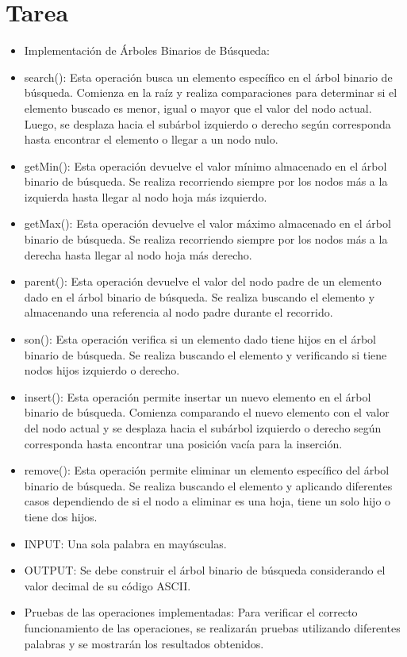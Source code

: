 \documentclass{article}
\begin{document}
	\section{Tarea}
	\begin{itemize}
		\item Implementación de Árboles Binarios de Búsqueda:
		\item search(): Esta operación busca un elemento específico en el árbol binario de búsqueda. Comienza en la raíz y realiza comparaciones para determinar si el elemento buscado es menor, igual o mayor que el valor del nodo actual. Luego, se desplaza hacia el subárbol izquierdo o derecho según corresponda hasta encontrar el elemento o llegar a un nodo nulo.
		\item getMin(): Esta operación devuelve el valor mínimo almacenado en el árbol binario de búsqueda. Se realiza recorriendo siempre por los nodos más a la izquierda hasta llegar al nodo hoja más izquierdo.
		\item getMax(): Esta operación devuelve el valor máximo almacenado en el árbol binario de búsqueda. Se realiza recorriendo siempre por los nodos más a la derecha hasta llegar al nodo hoja más derecho.
		\item parent(): Esta operación devuelve el valor del nodo padre de un elemento dado en el árbol binario de búsqueda. Se realiza buscando el elemento y almacenando una referencia al nodo padre durante el recorrido.
		\item son(): Esta operación verifica si un elemento dado tiene hijos en el árbol binario de búsqueda. Se realiza buscando el elemento y verificando si tiene nodos hijos izquierdo o derecho.
		\item insert(): Esta operación permite insertar un nuevo elemento en el árbol binario de búsqueda. Comienza comparando el nuevo elemento con el valor del nodo actual y se desplaza hacia el subárbol izquierdo o derecho según corresponda hasta encontrar una posición vacía para la inserción.
		\item remove(): Esta operación permite eliminar un elemento específico del árbol binario de búsqueda. Se realiza buscando el elemento y aplicando diferentes casos dependiendo de si el nodo a eliminar es una hoja, tiene un solo hijo o tiene dos hijos.
		\item INPUT: Una sola palabra en mayúsculas.
		\item OUTPUT: Se debe construir el árbol binario de búsqueda considerando el valor decimal de su código ASCII.
		\item Pruebas de las operaciones implementadas: Para verificar el correcto funcionamiento de las operaciones, se realizarán pruebas utilizando diferentes palabras y se mostrarán los resultados obtenidos.

\end{itemize}
\end{document}
